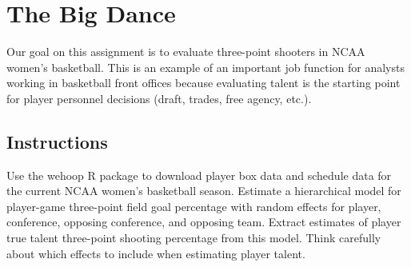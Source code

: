 \documentclass{article}
\begin{document}
  \section*{\sc The Big Dance}

    Our goal on this assignment is to evaluate three-point shooters in NCAA women's basketball. This is an example of an important job function for analysts working in basketball front offices because evaluating talent is the starting point for player personnel decisions (draft, trades, free agency, etc.).

    \subsection*{\sc Instructions}

      Use the wehoop R package to download player box data and schedule data for the current NCAA women's basketball season. Estimate a hierarchical model for player-game three-point field goal percentage with random effects for player, conference, opposing conference, and opposing team. Extract estimates of player true talent three-point shooting percentage from this model. Think carefully about which effects to include when estimating player talent.
\end{document}

